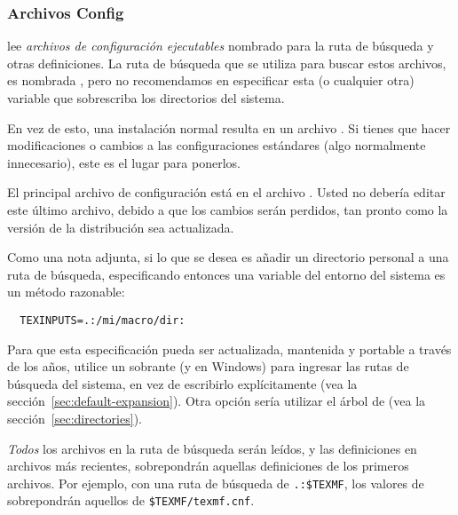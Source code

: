 \documentclass{article}
\begin{document}
\subsubsection{Archivos Config}
\label{sec:configfiles}

\KPS{} lee \emph{archivos de configuración ejecutables} nombrado
 para la ruta de búsqueda y otras definiciones. La ruta
de búsqueda que se utiliza para buscar estos archivos, es nombrada
, pero no recomendamos en especificar esta (o
cualquier otra) variable que sobrescriba los directorios del sistema. 

En vez de esto, una instalación normal resulta en un archivo
. Si tienes que hacer modificaciones o
cambios a las configuraciones estándares (algo normalmente
innecesario), este es el lugar para ponerlos.

El principal archivo de configuración está en el archivo
.  Usted no debería editar
este último archivo, debido a que los cambios serán perdidos,
tan pronto como la versión de la distribución sea actualizada.

Como una nota adjunta, si lo que se desea es añadir un directorio personal a una ruta de búsqueda, especificando entonces una variable del entorno del sistema es un método razonable:
\begin{verbatim}
  TEXINPUTS=.:/mi/macro/dir:
\end{verbatim}
Para que esta especificación pueda ser actualizada, mantenida y portable a través de los años, utilice un sobrante \samp{:} (y \samp{;} en Windows) para ingresar las rutas de búsqueda del sistema, en vez de escribirlo explícitamente (vea la sección~\ref{sec:default-expansion}). Otra opción sería utilizar el árbol de  (vea la sección~\ref{sec:directories}).


\emph{Todos} los archivos  en la ruta de
búsqueda serán leídos, y las definiciones en archivos más
recientes, sobrepondrán aquellas definiciones de los primeros archivos. Por
ejemplo, con una ruta de búsqueda de \verb|.:$TEXMF|, los
valores de  sobrepondrán aquellos de
\verb|$TEXMF/texmf.cnf|.
\end{document}

